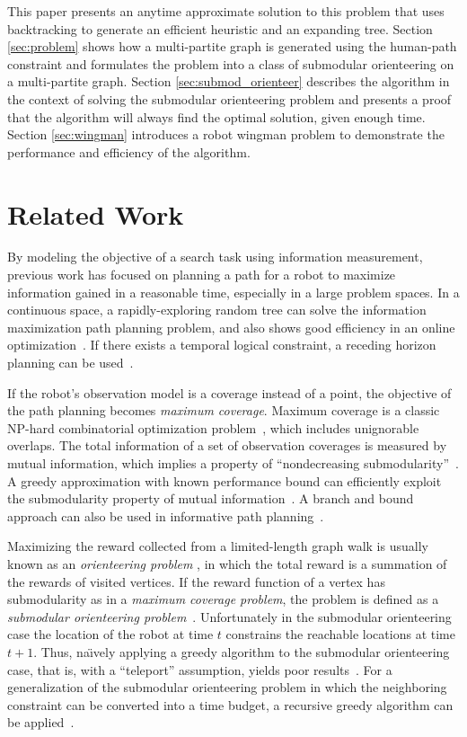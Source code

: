 This paper presents an anytime approximate solution to this problem that uses backtracking to generate an efficient heuristic and an expanding tree.
Section \ref{sec:problem} shows how a multi-partite graph is generated using the human-path constraint and formulates the problem into a class of submodular orienteering on a multi-partite graph.
Section \ref{sec:submod_orienteer} describes the algorithm in the context of solving the submodular orienteering problem and presents a proof that the algorithm will always find the optimal solution, given enough time.
Section \ref{sec:wingman} introduces a robot wingman problem to demonstrate the performance and efficiency of the algorithm.

\section{Related Work}
By modeling the objective of a search task using information measurement, previous work has focused on planning a path for a robot to maximize information gained in a reasonable time, especially in a large problem spaces.
In a continuous space, a rapidly-exploring random tree can solve the information maximization path planning problem, and also shows good efficiency in an online optimization~\cite{levine2010information}.
If there exists a temporal logical constraint, a receding horizon planning can be used~\cite{JonesSchwagerBeltaICRA13scLTLInfo}.

If the robot's observation model is a coverage instead of a point, the objective of the path planning becomes \emph{maximum coverage}.
Maximum coverage is a classic NP-hard combinatorial optimization problem~\cite{megiddo1983maximum}, which includes unignorable overlaps.
The total information of a set of observation coverages is measured by mutual information, which implies a property of ``nondecreasing submodularity''~\cite{singh2009efficient}.
A greedy approximation with known performance bound can efficiently exploit the submodularity property of mutual information~\cite{singh2009efficient}.
A branch and bound approach can also be used in informative path planning~\cite{binney2012branch}.

Maximizing the reward collected from a limited-length graph walk is usually known as an \emph{orienteering problem} \cite{Vansteenwegen20111}, in which the total reward is a summation of the rewards of visited vertices.
If the reward function of a vertex has submodularity as in a \emph{maximum coverage problem}, the problem is defined as a \emph{submodular orienteering problem}~\cite{chekuri2005recursive}.
Unfortunately in the submodular orienteering case
the location of the robot at time $ t $ constrains the reachable locations at time $ t+1 $.
Thus, na\"{\i}vely applying a greedy algorithm to the submodular orienteering case, that is, with a ``teleport'' assumption, yields poor results~\cite{krause2012submodular}.
For a generalization of the submodular orienteering problem in which the neighboring constraint can be converted into a time budget, a recursive greedy algorithm can be applied~\cite{chekuri2005recursive}.